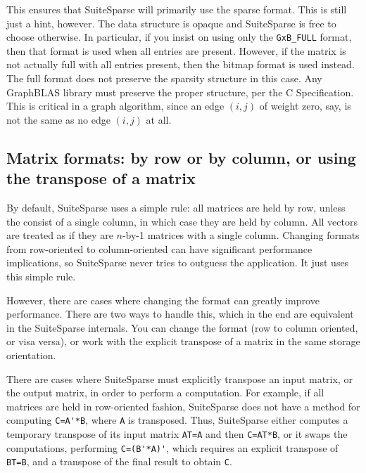 \documentclass[12pt]{article}
\begin{document}
This ensures that SuiteSparse will primarily use the sparse format.  This is
still just a hint, however.  The data structure is opaque and SuiteSparse is
free to choose otherwise.  In particular, if you insist on using only the
\verb'GxB_FULL' format, then that format is used when all entries are present.
However, if the matrix is not actually full with all entries present, then the
bitmap format is used instead.  The full format does not preserve the sparsity
structure in this case.  Any GraphBLAS library must preserve the proper
structure, per the C Specification.  This is critical in a graph algorithm,
since an edge $(i,j)$ of weight zero, say, is not the same as no edge $(i,j)$
at all.

\subsection{Matrix formats: by row or by column, or using the transpose of
a matrix}

By default, SuiteSparse uses a simple rule:
all matrices are held by row, unless the consist of a single
column, in which case they are held by column.  All vectors are treated as if
they are $n$-by-1 matrices with a single column.  Changing formats from
row-oriented to column-oriented can have significant performance implications,
so SuiteSparse never tries to outguess the application.  It just uses this
simple rule.

However, there are cases where changing the format can greatly improve
performance.  There are two ways to handle this, which in the end are
equivalent in the SuiteSparse internals.  You can change the format (row to
column oriented, or visa versa), or work with the explicit transpose of a
matrix in the same storage orientation.

There are cases where SuiteSparse must explicitly transpose an input matrix, or
the output matrix, in order to perform a computation.  For example, if all
matrices are held in row-oriented fashion, SuiteSparse does not have a method
for computing \verb"C=A'*B", where \verb'A' is transposed.  Thus, SuiteSparse
either computes a temporary transpose of its input matrix \verb'AT=A' and then
\verb'C=AT*B', or it swaps the computations, performing \verb"C=(B'*A)'", which
requires an explicit transpose of \verb'BT=B', and a transpose of the final
result to obtain \verb'C'.
\end{document}
